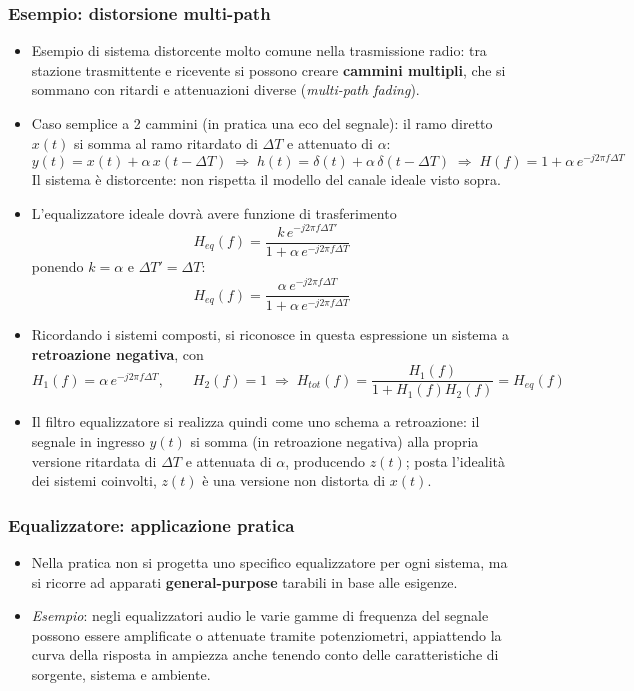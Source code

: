 \documentclass[12pt, a4paper]{article}
\begin{document}
\subsubsection{Esempio: distorsione multi-path}
\begin{itemize}
    \item Esempio di sistema distorcente molto comune nella trasmissione radio: tra stazione trasmittente e ricevente si possono creare \textbf{cammini multipli}, che si sommano con ritardi e attenuazioni diverse (\textit{multi-path fading}).
    \item Caso semplice a 2 cammini (in pratica una eco del segnale): il ramo diretto $x(t)$ si somma al ramo ritardato di $\Delta T$ e attenuato di $\alpha$:
    $$y(t) = x(t) + \alpha\,x(t-\Delta T) \;\Longrightarrow\; h(t)=\delta(t)+\alpha\,\delta(t-\Delta T) \;\Longrightarrow\; H(f) = 1+\alpha\,e^{-j2\pi f\Delta T}$$
    Il sistema è distorcente: non rispetta il modello del canale ideale visto sopra.
    \item L'equalizzatore ideale dovrà avere funzione di trasferimento
    $$H_{eq}(f) = \frac{k\,e^{-j2\pi f\Delta T'}}{1+\alpha\,e^{-j2\pi f\Delta T}}$$
    ponendo $k=\alpha$ e $\Delta T'=\Delta T$:
    $$H_{eq}(f) = \frac{\alpha\,e^{-j2\pi f\Delta T}}{1+\alpha\,e^{-j2\pi f\Delta T}}$$
    \item Ricordando i sistemi composti, si riconosce in questa espressione un sistema a \textbf{retroazione negativa}, con
    $$H_1(f)=\alpha\,e^{-j2\pi f\Delta T}, \qquad H_2(f)=1 \;\Longrightarrow\; H_{tot}(f)=\frac{H_1(f)}{1+H_1(f)H_2(f)}=H_{eq}(f)$$
    \item Il filtro equalizzatore si realizza quindi come uno schema a retroazione: il segnale in ingresso $y(t)$ si somma (in retroazione negativa) alla propria versione ritardata di $\Delta T$ e attenuata di $\alpha$, producendo $z(t)$; posta l'idealità dei sistemi coinvolti, $z(t)$ è una versione non distorta di $x(t)$.
\end{itemize}

\subsubsection{Equalizzatore: applicazione pratica}
\begin{itemize}
    \item Nella pratica non si progetta uno specifico equalizzatore per ogni sistema, ma si ricorre ad apparati \textbf{general-purpose} tarabili in base alle esigenze.
    \item \textit{Esempio}: negli equalizzatori audio le varie gamme di frequenza del segnale possono essere amplificate o attenuate tramite potenziometri, appiattendo la curva della risposta in ampiezza anche tenendo conto delle caratteristiche di sorgente, sistema e ambiente.
\end{itemize}
\end{document}

